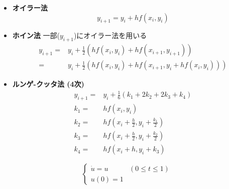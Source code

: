 \documentclass[12pt,b5paper]{ltjsarticle}
\begin{document}
\begin{itemize}
 \item
      \textbf{オイラー法}
      \begin{equation}
       y_{i+1} = y_{i} + hf(x_{i},y_{i})
      \end{equation}

 \item
      \textbf{ホイン法}
      \quad
      一部($y_{i+1}$)にオイラー法を用いる
      \begin{align}
       y_{i+1}
       =& y_{i} + \frac{1}{2}\left( h f(x_{i},y_{i}) + h f(x_{i+1},y_{i+1}) \right)\\
       =& y_{i} + \frac{1}{2}\left( h f(x_{i},y_{i}) + h f(x_{i+1},y_{i}+hf(x_{i},y_{i})) \right)
      \end{align}

 \item
      \textbf{ルンゲ-クッタ法 (4次)}
      \begin{align}
       y_{i+1} =& y_{i} + \frac{1}{6}(k_1+2k_2+2k_3+k_4)\\
       k_1 =& hf(x_{i},y_{i})\\
       k_2 =& hf \left( x_{i}+\frac{h}{2},y_{i}+\frac{k_1}{2} \right)\\
       k_3 =& hf \left( x_{i}+\frac{h}{2},y_{i}+\frac{k_2}{2} \right)\\
       k_4 =& hf(x_{i}+h,y_{i}+k_3)
      \end{align}
\end{itemize}



\hrulefill

\begin{equation}
 \begin{cases}
  \dot{u} = u & (0\leq t \leq 1)\\
  u(0)=1
 \end{cases}
 \label{problem}
\end{equation}
\end{document}
